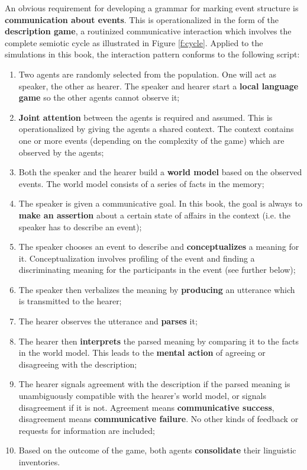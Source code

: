 An obvious requirement for developing a grammar for marking event structure is {\bfseries communication about events}. This is operationalized in the form of the {\bfseries description game}, a routinized communicative interaction which involves the complete semiotic cycle as illustrated in Figure \ref{f:cycle}. Applied to the simulations in this book, the interaction pattern conforms to the following script:

\begin{enumerate}
\item Two agents are randomly selected from the population. One will act as speaker, the other as hearer. The speaker and hearer start a {\bfseries local language game} so the other agents cannot observe it;
\item {\bfseries Joint attention} \citep{tomasello95jointattention} between the agents is required and assumed. This is operationalized by giving the agents a shared context. The context contains one or more events (depending on the complexity of the game) which are observed by the agents;
\item Both the speaker and the hearer build a {\bfseries world model} based on the observed events. The world model consists of a series of facts in the memory;
\item The speaker is given a communicative goal. In this book, the goal is always to {\bfseries make an assertion} about a certain state of affairs in the context (i.e. the speaker has to describe an event);
\item The speaker chooses an event to describe and {\bfseries conceptualizes} a meaning for it. Conceptualization involves profiling of the event and finding a discriminating meaning for the participants in the event (see further below);
\item The speaker then verbalizes the meaning by {\bfseries producing} an utterance which is transmitted to the hearer;
\item The hearer observes the utterance and {\bfseries parses} it;
\item The hearer then {\bfseries interprets} the parsed meaning by comparing it to the facts in the world model. This leads to the {\bfseries mental action} of agreeing or disagreeing with the description;
\item The hearer signals agreement with the description if the parsed meaning is unambiguously compatible with the hearer's world model, or signals disagreement if it is not. Agreement means {\bfseries communicative success}, disagreement means {\bfseries communicative failure}. No other kinds of feedback or requests for information are included;
\item Based on the outcome of the game, both agents {\bfseries consolidate} their linguistic inventories. 
\end{enumerate}

